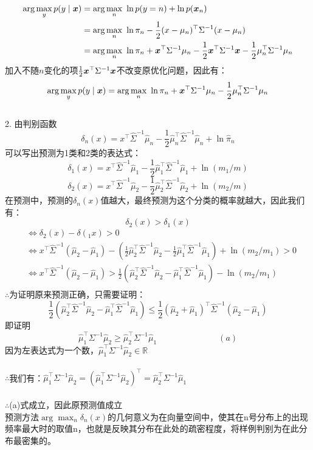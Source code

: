 \documentclass[answers]{exam}  %
\begin{document}
\begin{questions}
\begin{solution}
$$\begin{aligned}
			\arg\max_y p(y\mid\vx)
			&=\arg\max_n\ \ln p(y=n)+\ln p (\vx_n)\\
			&=\arg\max_n\ \ln\pi_n-\frac12(x-\mu_n)^\top\Sigma^{-1}(x-\mu_n)\\
			&=\arg\max_n\ \ln\pi_n+ \vx^\top\Sigma^{-1}\mu_n-\frac12\vx^\top\Sigma^{-1}\vx-\frac12\mu_n^\top\Sigma^{-1}{\mu_n}\\
		\end{aligned}
		$$
		 加入不随$n$变化的项$\frac12{\boldsymbol{x}}^\top\Sigma^{-1}{\boldsymbol{x}}$不改变原优化问题，因此有：
		 $$\arg\max_y p(y\mid\vx)=\arg\max_n\ \ln\pi_n+ \vx^\top\Sigma^{-1}\mu_n-\frac12\mu_n^\top\Sigma^{-1}{\mu_n}$$
		\\2.
			由判别函数
			$$ \delta_n(x)=x^\top\hat\Sigma^{-1}\hat\mu_n-\frac12\hat\mu_n^\top\hat\Sigma^{-1}\hat\mu_n+\ln \hat\pi_n$$
			可以写出预测为1类和2类的表达式：
			$$\delta_1(x)=x^\top\hat\Sigma^{-1}\hat\mu_1-\frac12\hat\mu_1^\top\hat\Sigma^{-1}\hat\mu_1+\ln ({m_1}/m)$$
			$$\delta_2(x)=x^\top\hat\Sigma^{-1}\hat\mu_2-\frac12\hat\mu_2^\top\hat\Sigma^{-1}\hat\mu_2+\ln ({m_2}/m)$$
			在预测中，预测的$\delta_n(x)$值越大，最终预测为这个分类的概率就越大，因此我们有：
			$$\delta_2(x)>\delta_1(x)$$
			$$\begin{aligned}
				&\iff \delta_2(x)-\delta(_1x)>0\\
				&\iff x^\top\hat\Sigma^{-1}(\hat\mu_2-\hat\mu_1)-(\frac12\hat\mu_2^\top\hat\Sigma^{-1}\hat\mu_2-\frac12\hat\mu_1^\top\hat\Sigma^{-1}\hat\mu_1)+\ln (m_2/m_1)>0\\
				&\iff x^\top\hat\Sigma^{-1}(\hat\mu_2-\hat\mu_1)>\frac12(\hat\mu_2^\top\hat\Sigma^{-1}\hat\mu_2-\hat\mu_1^\top\hat\Sigma^{-1}\hat\mu_1)-\ln (m_2/m_1)\\
			\end{aligned}$$
			$\therefore$为证明原来预测正确，只需要证明：
			$$\frac12(\hat\mu_2^\top\hat\Sigma^{-1}\hat\mu_2-\hat\mu_1^\top\hat\Sigma^{-1}\hat\mu_1)\le\frac12(\hat\mu_2+\hat\mu_1)^\top\hat\Sigma^{-1}(\hat\mu_2-\hat\mu_1)$$
		即证明$$\hat\mu_1^\top\Sigma^{-1}\hat\mu_2\ge \hat\mu_2^\top\Sigma^{-1}\hat\mu_1\quad\quad\quad\quad\quad\quad\quad\ (a)$$
		因为左表达式为一个数，$ \hat\mu_1^\top\Sigma^{-1}\hat\mu_2\in \mathbb R$\\\\
		$\therefore$我们有：$ \hat\mu_1^\top\Sigma^{-1}\hat\mu_2 = (\hat\mu_1^\top\Sigma^{-1}\hat\mu_2)^\top=\hat\mu_2^\top\Sigma^{-1}\hat\mu_1$\\\\
		$\therefore$(a)式成立，因此原预测值成立\\
		预测方法$\arg\max_n\delta_n(x)$的几何意义为在向量空间中，使其在n号分布上的出现频率最大时的取值n，也就是反映其分布在此处的疏密程度，将样例判别为在此分布最密集的。

\end{solution}
\end{questions}
\end{document}
